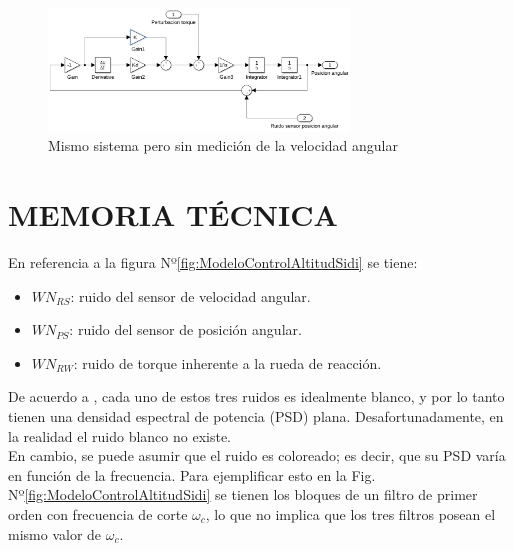 \documentclass[a4paper,11pt,twoside]{IT-CNEA}
\begin{document}
\begin{figure}[h!]
\centering
\includegraphics[width=8cm]{Figuras/SimulinkSistSinMedicionVelocidadAng.png}
\caption{Mismo sistema pero sin medición de la velocidad angular}
\label{fig:SimulinkSistSinMedicionVelocidadAng}
\end{figure}
\newpage
\section{MEMORIA TÉCNICA}
En referencia a la figura Nº\ref{fig:ModeloControlAltitudSidi} se tiene:
\begin{itemize}
\item $WN_{RS}$: ruido del sensor de velocidad angular. 
\item $WN_{PS}$: ruido del sensor de posición angular. 
\item $WN_{RW}$: ruido de torque inherente a la rueda de reacción.
\end{itemize}
De acuerdo a \cite{Sidi}, cada uno de estos tres ruidos es idealmente blanco, y por lo tanto tienen una densidad espectral de potencia (PSD) plana. Desafortunadamente, en la realidad el ruido blanco no existe. 
\\En cambio, se puede asumir que el ruido es coloreado; es decir, que su PSD varía en función de la frecuencia. Para ejemplificar esto en la Fig. Nº\ref{fig:ModeloControlAltitudSidi} se tienen los bloques de un filtro de primer orden con frecuencia de corte $\omega_c$, lo que no implica que los tres filtros posean el mismo valor de $\omega_c$.
\end{document}
